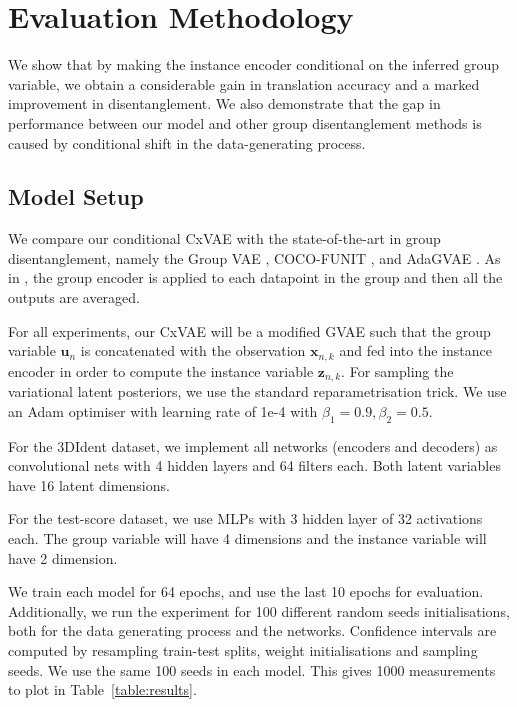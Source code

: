 \documentclass{article} %
\newcommand{\change}[1]{#1}
\newcommand{\todo}[1]{\textcolor{red}{#1}}
\begin{document}

\section{Evaluation Methodology}


We show that by making the instance encoder conditional on the inferred group variable, we obtain a considerable gain in translation accuracy and a marked improvement in disentanglement. We also demonstrate that the gap in performance between our model and other group disentanglement methods is caused by conditional shift in the data-generating process.

\subsection{Model Setup}
\label{sec:setup}

We compare our conditional CxVAE with the state-of-the-art in group disentanglement, namely the Group VAE \citep{Hosoya2019GroupbasedLO, Bouchacourt2018MultiLevelVA}, COCO-FUNIT \citep{Saito2020Coco}, and AdaGVAE \citep{Locatello2019ChallengingCA}. As in \citet{Hosoya2019GroupbasedLO}, the group encoder is applied to each datapoint in the group and then all the outputs are averaged. 

For all experiments, our CxVAE will be a modified GVAE such that the group variable $\mathbf{u}_n$ is concatenated with the observation $\mathbf{x}_{n,k}$ and fed into the instance encoder in order to compute the instance variable $\mathbf{z}_{n,k}$. For sampling the variational latent posteriors, we use the standard reparametrisation trick. We use an Adam optimiser with learning rate of 1e-4 with $\beta_1 = 0.9, \beta_2 = 0.5$.

\change{For the 3DIdent dataset, we implement all networks (encoders and decoders) as convolutional nets with 4 hidden layers and 64 filters each. Both latent variables have 16 latent dimensions.

For the test-score dataset, we use MLPs with 3 hidden layer of 32 activations each. The group variable will have 4 dimensions and the instance variable will have 2 dimension.}

We train each model for 64 epochs, and use the last 10 epochs for evaluation. Additionally, we run the experiment for 100 different random seeds initialisations, both for the data generating process and the networks. Confidence intervals are computed by resampling train-test splits, weight initialisations and sampling seeds. We use the same 100 seeds in each model. This gives 1000 measurements to plot in Table~\ref{table:results}.
\end{document}
